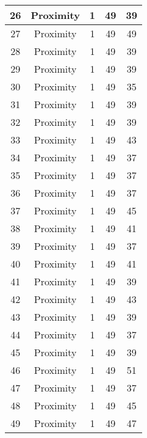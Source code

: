 \documentclass[results.tex]{subfiles}
\begin{document}
\begin{center}
\begin{tabular}{| c || c | c | c | c |}
    \hline
    26 & Proximity & 1 & 49 & 39 \\ 
    \hline
    27 & Proximity & 1 & 49 & 49 \\ 
    \hline
    28 & Proximity & 1 & 49 & 39 \\ 
    \hline
    29 & Proximity & 1 & 49 & 39 \\ 
    \hline
    30 & Proximity & 1 & 49 & 35 \\ 
    \hline
    31 & Proximity & 1 & 49 & 39 \\ 
    \hline
    32 & Proximity & 1 & 49 & 39 \\ 
    \hline
    33 & Proximity & 1 & 49 & 43 \\ 
    \hline
    34 & Proximity & 1 & 49 & 37 \\ 
    \hline
    35 & Proximity & 1 & 49 & 37 \\ 
    \hline
    36 & Proximity & 1 & 49 & 37 \\ 
    \hline
    37 & Proximity & 1 & 49 & 45 \\ 
    \hline
    38 & Proximity & 1 & 49 & 41 \\ 
    \hline
    39 & Proximity & 1 & 49 & 37 \\ 
    \hline
    40 & Proximity & 1 & 49 & 41 \\ 
    \hline
    41 & Proximity & 1 & 49 & 39 \\ 
    \hline
    42 & Proximity & 1 & 49 & 43 \\ 
    \hline
    43 & Proximity & 1 & 49 & 39 \\ 
    \hline
    44 & Proximity & 1 & 49 & 37 \\ 
    \hline
    45 & Proximity & 1 & 49 & 39 \\ 
    \hline
    46 & Proximity & 1 & 49 & 51 \\ 
    \hline
    47 & Proximity & 1 & 49 & 37 \\ 
    \hline
    48 & Proximity & 1 & 49 & 45 \\ 
    \hline
    49 & Proximity & 1 & 49 & 47 \\ 
    \hline   \end{tabular}
\end{center}
\end{document}
